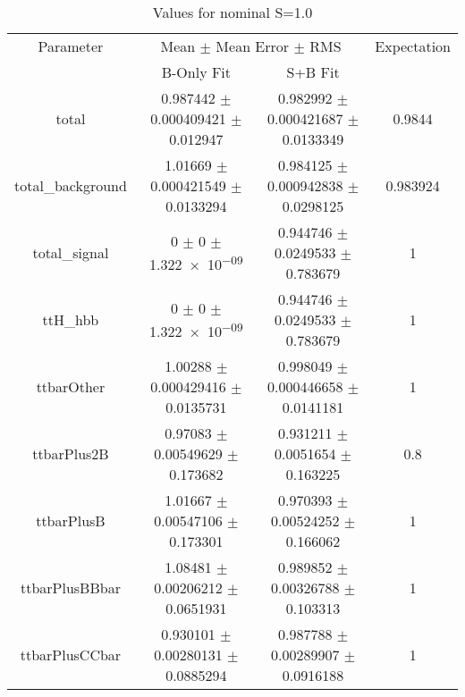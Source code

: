 \begin{table}
\centering
\caption{Values for nominal S=1.0}
\begin{tabular}{cccc}
\toprule
Parameter & \multicolumn{2}{c}{Mean $\pm$ Mean Error $\pm$ RMS} & Expectation\\
 & B-Only Fit & S+B Fit & \\
\midrule
total & \num{0.987442} $\pm$ \num{0.000409421} $\pm$ \num{0.012947} & \num{0.982992} $\pm$ \num{0.000421687} $\pm$ \num{0.0133349} & \num{0.9844}\\
total\_background & \num{1.01669} $\pm$ \num{0.000421549} $\pm$ \num{0.0133294} & \num{0.984125} $\pm$ \num{0.000942838} $\pm$ \num{0.0298125} & \num{0.983924}\\
total\_signal & \num{0} $\pm$ \num{0} $\pm$ \num{1.322e-09} & \num{0.944746} $\pm$ \num{0.0249533} $\pm$ \num{0.783679} & \num{1}\\
ttH\_hbb & \num{0} $\pm$ \num{0} $\pm$ \num{1.322e-09} & \num{0.944746} $\pm$ \num{0.0249533} $\pm$ \num{0.783679} & \num{1}\\
ttbarOther & \num{1.00288} $\pm$ \num{0.000429416} $\pm$ \num{0.0135731} & \num{0.998049} $\pm$ \num{0.000446658} $\pm$ \num{0.0141181} & \num{1}\\
ttbarPlus2B & \num{0.97083} $\pm$ \num{0.00549629} $\pm$ \num{0.173682} & \num{0.931211} $\pm$ \num{0.0051654} $\pm$ \num{0.163225} & \num{0.8}\\
ttbarPlusB & \num{1.01667} $\pm$ \num{0.00547106} $\pm$ \num{0.173301} & \num{0.970393} $\pm$ \num{0.00524252} $\pm$ \num{0.166062} & \num{1}\\
ttbarPlusBBbar & \num{1.08481} $\pm$ \num{0.00206212} $\pm$ \num{0.0651931} & \num{0.989852} $\pm$ \num{0.00326788} $\pm$ \num{0.103313} & \num{1}\\
ttbarPlusCCbar & \num{0.930101} $\pm$ \num{0.00280131} $\pm$ \num{0.0885294} & \num{0.987788} $\pm$ \num{0.00289907} $\pm$ \num{0.0916188} & \num{1}\\
\bottomrule
\end{tabular}
\end{table}